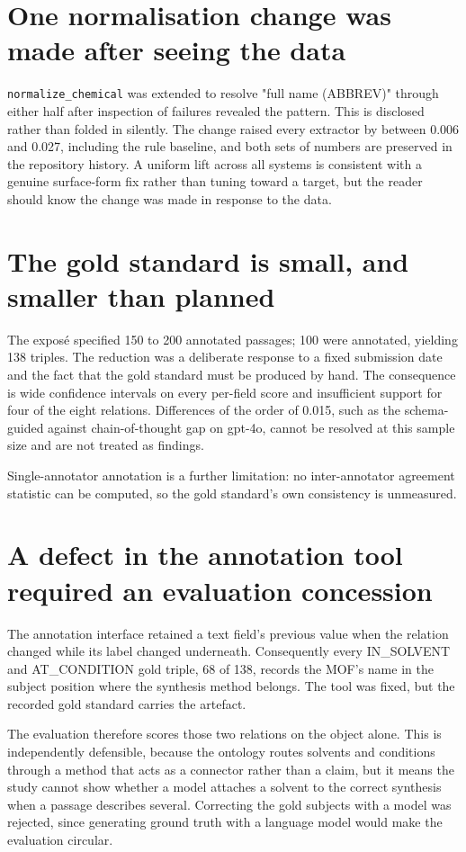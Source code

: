 \documentclass[11pt,a4paper,oneside]{report}
\begin{document}
\section{One normalisation change was made after seeing the data}

\texttt{normalize\_\allowbreak{}chemical} was extended to resolve "full name (ABBREV)" through either half after inspection of failures revealed the pattern. This is disclosed rather than folded in silently. The change raised every extractor by between 0.006 and 0.027, including the rule baseline, and both sets of numbers are preserved in the repository history. A uniform lift across all systems is consistent with a genuine surface-form fix rather than tuning toward a target, but the reader should know the change was made in response to the data.

\section{The gold standard is small, and smaller than planned}

The exposé specified 150 to 200 annotated passages; 100 were annotated, yielding 138 triples. The reduction was a deliberate response to a fixed submission date and the fact that the gold standard must be produced by hand. The consequence is wide confidence intervals on every per-field score and insufficient support for four of the eight relations. Differences of the order of 0.015, such as the schema-guided against chain-of-thought gap on gpt-4o, cannot be resolved at this sample size and are not treated as findings.

Single-annotator annotation is a further limitation: no inter-annotator agreement statistic can be computed, so the gold standard's own consistency is unmeasured.

\section{A defect in the annotation tool required an evaluation concession}

The annotation interface retained a text field's previous value when the relation changed while its label changed underneath. Consequently every IN\_SOLVENT and AT\_CONDITION gold triple, 68 of 138, records the MOF's name in the subject position where the synthesis method belongs. The tool was fixed, but the recorded gold standard carries the artefact.

The evaluation therefore scores those two relations on the object alone. This is independently defensible, because the ontology routes solvents and conditions through a method that acts as a connector rather than a claim, but it means the study cannot show whether a model attaches a solvent to the correct synthesis when a passage describes several. Correcting the gold subjects with a model was rejected, since generating ground truth with a language model would make the evaluation circular.
\end{document}
